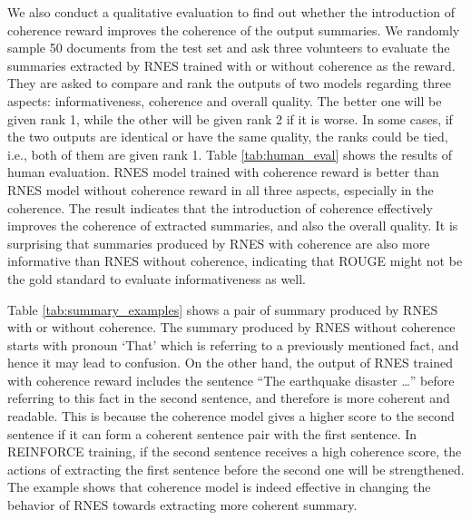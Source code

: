 \documentclass[letterpaper]{article} %
\begin{document}
	We also conduct a qualitative evaluation to find out whether the introduction of coherence reward improves the coherence of the output summaries. We randomly sample 50 documents from the test set and ask three volunteers to evaluate the summaries extracted by RNES trained with or without coherence as the reward. They are asked to compare and rank the outputs of two models regarding three aspects: informativeness, coherence and overall quality. The better one will be given rank 1, while the other will be given rank 2 if it is worse. In some cases, if the two outputs are identical or have the same quality, the ranks could be tied, i.e., both of them are given rank 1. Table \ref{tab:human_eval} shows the results of human evaluation. RNES model trained with coherence reward is better than RNES model without coherence reward in all three aspects, especially in the coherence. The result indicates that the introduction of coherence effectively improves the coherence of extracted summaries, and also the overall quality. It is surprising that summaries produced by RNES with coherence are also more informative than RNES without coherence, indicating that ROUGE might not be the gold standard to evaluate informativeness as well. 
	
	Table \ref{tab:summary_examples} shows a pair of summary produced by RNES with or without coherence. The summary produced by RNES without coherence starts with pronoun `That' which is referring to a previously mentioned fact, and hence it may lead to confusion. On the other hand, the output of RNES trained with coherence reward includes the sentence ``The earthquake disaster \dots'' before referring to this fact in the second sentence, and therefore is more coherent and readable. This is because the coherence model gives a higher score to the second sentence if it can form a coherent sentence pair with the first sentence. In REINFORCE training, if the second sentence receives a high coherence score, the actions of extracting the first sentence before the second one will be strengthened. The example shows that coherence model is indeed effective in changing the behavior of RNES towards extracting more coherent summary.
		
\end{document}
